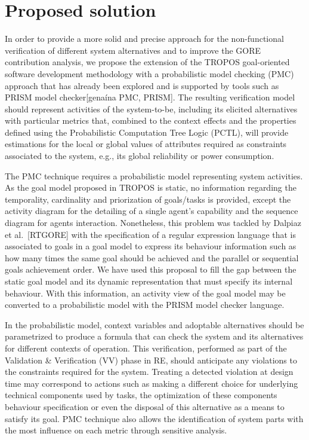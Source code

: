 \section{Proposed solution}

In order to provide a more solid and precise approach for the non-functional verification of different system alternatives and to improve the GORE contribution analysis, we propose the extension of the TROPOS goal-oriented software development methodology with a probabilistic model checking (PMC) approach that has already been explored and is supported by tools such as PRISM model checker[genaína PMC, PRISM]. The resulting verification model should represent activities of the system-to-be, including its elicited alternatives with particular metrics that, combined to the context effects and the properties defined using the Probabilistic Computation Tree Logic (PCTL), will provide estimations for the local or global values of attributes required as constraints associated to the system, e.g., its global reliability or power consumption.

The PMC technique requires a probabilistic model representing system activities. As the goal model proposed in TROPOS is static, no information regarding the temporality, cardinality and priorization of goals/tasks is provided, except the   activity diagram for the detailing of a single agent's capability and the sequence diagram for agents interaction. Nonetheless, this problem was tackled by Dalpiaz et al.~[RTGORE] with the specification of a regular expression language that is associated to goals in a goal model to express its behaviour information such as how many times the same goal should be achieved and the parallel or sequential goals achievement order. We have used this proposal to fill the gap between the static goal model and its dynamic representation that must specify its internal behaviour. With this information, an activity view of the goal model may be converted to a probabilistic model with the PRISM model checker language.

In the probabilistic model, context variables and adoptable alternatives should be parametrized to produce a formula that can check the system and its alternatives for different contexts of operation. This verification, performed as part of the Validation \& Verification (VV) phase in RE, should anticipate any violations to the constraints required for the system. Treating a detected violation at design time may correspond to actions such as making a different choice for underlying technical components used by tasks, the optimization of these components behaviour specification or even the disposal of this alternative as a means to satisfy its goal. PMC technique also allows the identification of system parts with the most influence on each metric through sensitive analysis.

